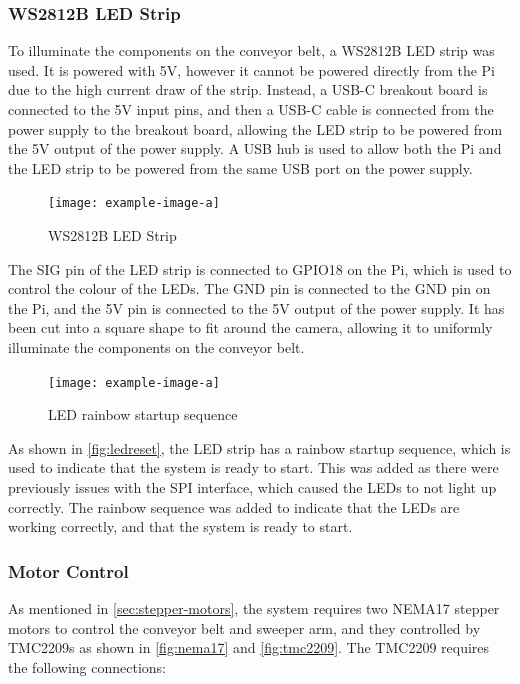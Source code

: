 \subsubsection{WS2812B LED Strip}
\label{sec:ws2812b-led-strip}
To illuminate the components on the conveyor belt, a WS2812B LED strip was used. It is powered with 5V, however it cannot be powered directly from the Pi due to the high current draw of the strip. Instead, a USB-C breakout board is connected to the 5V input pins, and then a USB-C cable is connected from the power supply to the breakout board, allowing the LED strip to be powered from the 5V output of the power supply. A USB hub is used to allow both the Pi and the LED strip to be powered from the same USB port on the power supply.

\begin{figure}[H]
  \hfill
  \begin{minipage}[t]{\textwidth}
    \centering
    \texttt{[image: example-image-a]}
    \caption{WS2812B LED Strip}
  \end{minipage}
\end{figure}

The SIG pin of the LED strip is connected to GPIO18 on the Pi, which is used to control the colour of the LEDs. The GND pin is connected to the GND pin on the Pi, and the 5V pin is connected to the 5V output of the power supply. It has been cut into a square shape to fit around the camera, allowing it to uniformly illuminate the components on the conveyor belt.

\begin{figure}[H]
  \hfill
  \begin{minipage}[t]{\textwidth}
    \centering
    \texttt{[image: example-image-a]}
    \caption{LED rainbow startup sequence}
    \label{fig:ledreset}
  \end{minipage}
\end{figure}

As shown in \autoref{fig:ledreset}, the LED strip has a rainbow startup sequence, which is used to indicate that the system is ready to start. This was added as there were previously issues with the SPI interface, which caused the LEDs to not light up correctly. The rainbow sequence was added to indicate that the LEDs are working correctly, and that the system is ready to start.

\subsubsection{Motor Control}
As mentioned in \autoref{sec:stepper-motors}, the system requires two NEMA17 stepper motors 
to control the conveyor belt and sweeper arm, and they controlled by TMC2209s as shown in \autoref{fig:nema17} and \autoref{fig:tmc2209}. The TMC2209 requires the following connections:

